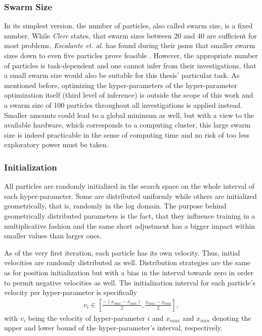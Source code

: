 \subsubsection{Swarm Size}
In its simplest version, the number of particles, also called swarm size, is a fixed number.
While \textit{Clerc} states, that swarm sizes between 20 and 40 are sufficient for most problems, \textit{Escalante et. al.} has found during their \gls{psms} that smaller swarm sizes down to even five particles prove feasible \cite{Clerc2006, EsMo2009}.
However, the appropriate number of particles is task-dependent and one cannot infer from their investigations, that a small swarm  size would also be suitable for this thesis' particular task.
As mentioned before, optimizing the hyper-parameters of the hyper-parameter optimization itself (third level of inference) is outside the scope of this work and a swarm size of 100 particles throughout all investigations is applied instead.
Smaller amounts could lead to a global minimum as well, but with a view to the available hardware, which corresponds to a computing cluster, this large swarm size is indeed practicable in the sense of computing time and no risk of too less exploratory power must be taken.

\subsubsection{Initialization}
All particles are randomly initialized in the search space on the whole interval of each hyper-parameter.
Some are distributed uniformly while others are initialized geometrically, that is, randomly in the log domain.
The purpose behind geometrically distributed parameters is the fact, that they influence training in a multiplicative fashion and the same short adjustment has a bigger impact within smaller values than larger ones.

As of the very first iteration, each particle has its own velocity.
Thus, initial velocities are randomly distributed as well.
Distribution strategies are the same as for position initialization but with a bias in the interval towards zero in order to permit negative velocities as well.
The initialization interval for each particle's velocity per hyper-parameter is specifically
\begin{align}
	v_i\in[\frac{-(x_{max} - x_{min})}{2}, \frac{x_{max} - x_{min}}{2}],
\end{align}
with $v_i$ being the velocity of hyper-parameter $i$ and $x_{max}$ and $x_{min}$ denoting the upper and lower bound of the hyper-parameter's interval, respectively.

